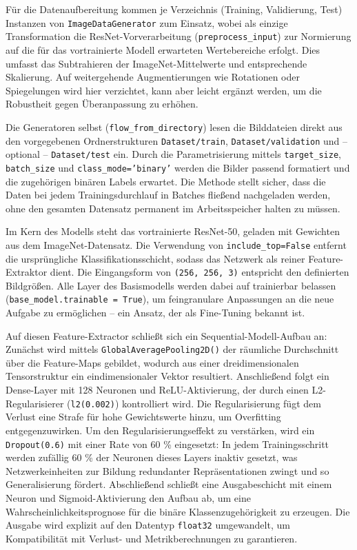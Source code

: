 Für die Datenaufbereitung kommen je Verzeichnis (Training, Validierung, Test) Instanzen von \texttt{ImageDataGenerator} zum Einsatz, wobei als einzige Transformation die ResNet-Vorverarbeitung (\texttt{preprocess\_input}) zur Normierung auf die für das vortrainierte Modell erwarteten Wertebereiche erfolgt. Dies umfasst das Subtrahieren der ImageNet-Mittelwerte und entsprechende Skalierung. Auf weitergehende Augmentierungen wie Rotationen oder Spiegelungen wird hier verzichtet, kann aber leicht ergänzt werden, um die Robustheit gegen Überanpassung zu erhöhen.

Die Generatoren selbst (\texttt{flow\_from\_directory}) lesen die Bilddateien direkt aus den vorgegebenen Ordnerstrukturen \texttt{Dataset/train}, \texttt{Dataset/validation} und – optional – \texttt{Dataset/test} ein. Durch die Parametrisierung mittels \texttt{target\_size}, \texttt{batch\_size} und \texttt{class\_mode='binary'} werden die Bilder passend formatiert und die zugehörigen binären Labels erwartet. Die Methode stellt sicher, dass die Daten bei jedem Trainingsdurchlauf in Batches fließend nachgeladen werden, ohne den gesamten Datensatz permanent im Arbeitsspeicher halten zu müssen.

Im Kern des Modells steht das vortrainierte ResNet-50, geladen mit Gewichten aus dem ImageNet-Datensatz. Die Verwendung von \texttt{include\_top=False} entfernt die ursprüngliche Klassifikationsschicht, sodass das Netzwerk als reiner Feature-Extraktor dient. Die Eingangsform von \texttt{(256, 256, 3)} entspricht den definierten Bildgrößen. Alle Layer des Basismodells werden dabei auf trainierbar belassen (\texttt{base\_model.trainable = True}), um feingranulare Anpassungen an die neue Aufgabe zu ermöglichen – ein Ansatz, der als Fine-Tuning bekannt ist.

Auf diesen Feature-Extractor schließt sich ein Sequential-Modell-Aufbau an: Zunächst wird mittels \texttt{GlobalAveragePooling2D()} der räumliche Durchschnitt über die Feature-Maps gebildet, wodurch aus einer dreidimensionalen Tensorstruktur ein eindimensionaler Vektor resultiert. Anschließend folgt ein Dense-Layer mit 128 Neuronen und ReLU-Aktivierung, der durch einen L2-Regularisierer (\texttt{l2(0.002)}) kontrolliert wird. Die Regularisierung fügt dem Verlust eine Strafe für hohe Gewichtswerte hinzu, um Overfitting entgegenzuwirken. Um den Regularisierungseffekt zu verstärken, wird ein \texttt{Dropout(0.6)} mit einer Rate von 60 \% eingesetzt: In jedem Trainingsschritt werden zufällig 60 \% der Neuronen dieses Layers inaktiv gesetzt, was Netzwerkeinheiten zur Bildung redundanter Repräsentationen zwingt und so Generalisierung fördert. Abschließend schließt eine Ausgabeschicht mit einem Neuron und Sigmoid-Aktivierung den Aufbau ab, um eine Wahrscheinlichkeitsprognose für die binäre Klassenzugehörigkeit zu erzeugen. Die Ausgabe wird explizit auf den Datentyp \texttt{float32} umgewandelt, um Kompatibilität mit Verlust- und Metrikberechnungen zu garantieren.


